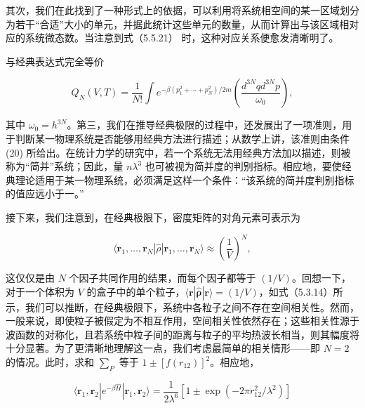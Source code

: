 其次，我们在此找到了一种形式上的依据，可以利用将系统相空间的某一区域划分为若干``合适''大小的单元，并据此统计这些单元的数量，从而计算出与该区域相对应的系统微态数。当注意到式（5.5.21） 时，这种对应关系便愈发清晰明了。

与经典表达式完全等价

\begin{equation}\tag{5.4.41}\label{eq:5.4.41}
Q _ { N } ( V , T ) = \frac { 1 } { N ! } \int e ^{- \beta ( p _ { 1} ^{2} + \cdots + p _ { N } ^{2} ) / 2 m } \left( \frac { d ^{3 N} q d ^{3 N} p } { \omega _ { 0 } } \right) ,
\end{equation}

其中 \(\omega_{0}=h^{3N}\)。第三，我们在推导经典极限的过程中，还发展出了一项准则，用于判断某一物理系统是否能够用经典方法进行描述；从数学上讲，该准则由条件 (20) 所给出。在统计力学的研究中，若一个系统无法用经典方法加以描述，则被称为``简并''系统；因此，量 \(n\lambda^{3}\) 也可被视为简并度的判别指标。相应地，要使经典理论适用于某一物理系统，必须满足这样一个条件：``该系统的简并度判别指标的值应远小于一。''

接下来，我们注意到，在经典极限下，密度矩阵的对角元素可表示为

\begin{equation}\tag{5.4.42}\label{eq:5.4.42}
\langle \pmb { r } _ { 1 } , \ldots , \pmb { r } _ { N } | \hat { \rho } | \pmb { r } _ { 1 } , \ldots , \pmb { r } _ { N } \rangle \approx \left( \frac { 1 } { V } \right) ^{N} ,
\end{equation}

这仅仅是由 \(N\) 个因子共同作用的结果，而每个因子都等于 \((1/V)\)。回想一下，对于一个体积为 \(V\) 的盒子中的单个粒子，\(\langle \boldsymbol{r} | \hat{\boldsymbol{\rho}} | \boldsymbol{r} \rangle = (1/V)\)，如式（5.3.14）所示，我们可以推断，在经典极限下，系统中各粒子之间不存在空间相关性。然而，一般来说，即使粒子被假定为不相互作用，空间相关性依然存在；这些相关性源于波函数的对称化，且若系统中粒子间的距离与粒子的平均热波长相当，则其幅度将十分显著。为了更清晰地理解这一点，我们考虑最简单的相关情形------即 \(N=2\) 的情况。此时，求和 \(\sum_{P}\) 等于 \(1 \pm [f(r_{12})]^{2}\)。相应地，

\begin{equation}\tag{5.4.43}\label{eq:5.4.43}
\langle \pmb { r } _ { 1 } , \pmb { r } _ { 2 } | e ^{- \beta \hat { H} } | \pmb { r } _ { 1 } , \pmb { r } _ { 2 } \rangle = \frac { 1 } { 2 \lambda ^{6} } \left[ 1 \pm \exp \left( - 2 \pi r _ { 12 } ^{2} / \lambda ^{2} \right) \right]
\end{equation}

